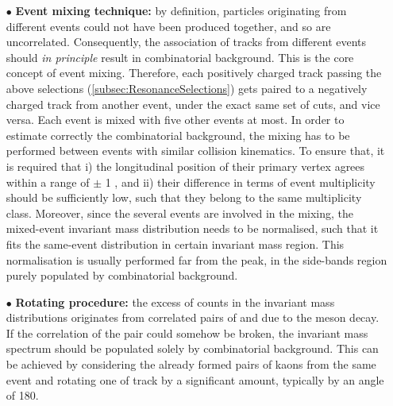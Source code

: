 \begin{itemize}
\item[$\bullet$] \textbf{Event mixing technique:} by definition, particles originating from different events could not have been produced together, and so are uncorrelated. Consequently, the association of tracks from different events should \textit{in principle} result in combinatorial background. This is the core concept of event mixing.
Therefore, each positively charged track passing the above selections (\Sec\ref{subsec:ResonanceSelections}) gets paired to a negatively charged track from another event, under the exact same set of cuts, and vice versa. Each event is mixed with five other events at most.
In order to estimate correctly the combinatorial background, the mixing has to be performed between events with similar collision kinematics. To ensure that, it is required that i) the longitudinal position of their primary vertex agrees within a range of $\pm$ 1 \cm, and ii) their difference in terms of event multiplicity should be sufficiently low, such that they belong to the same multiplicity class. Moreover, since the several events are involved in the mixing, the mixed-event invariant mass distribution needs to be normalised, such that it fits the same-event distribution in certain invariant mass region. This normalisation is usually performed far from the peak, in the side-bands region purely populated by combinatorial background.
\item[$\bullet$] \textbf{Rotating procedure:} the excess of counts in the invariant mass distributions originates from correlated pairs of \rmKplus and \rmKminus due to the \rmPhiMes meson decay. If the correlation of the pair could somehow be broken, the invariant mass spectrum should be populated solely by combinatorial background. This can be achieved by considering the already formed pairs of kaons from the same event and rotating one of track by a significant amount, typically by an angle of 180\textdegree. 
\end{itemize}


